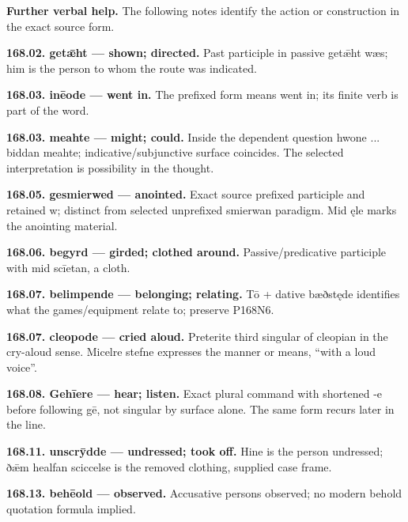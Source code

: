 \textbf{Further verbal help.} The following notes identify the action or construction in the exact source form.

\textbf{168.02. getǣht — shown; directed.} Past participle in passive getǣht wæs; him is the person to whom the route was indicated.

\textbf{168.03. inēode — went in.} The prefixed form means went in; its finite verb is part of the word.

\textbf{168.03. meahte — might; could.} Inside the dependent question hwone ... biddan meahte; indicative/\allowbreak{}subjunctive surface coincides. The selected interpretation is possibility in the thought.

\textbf{168.05. gesmierwed — anointed.} Exact source prefixed participle and retained w; distinct from selected unprefixed smierwan paradigm. Mid ęle marks the anointing material.

\textbf{168.06. begyrd — girded; clothed around.} Passive/\allowbreak{}predicative participle with mid scīetan, a cloth.

\textbf{168.07. belimpende — belonging; relating.} Tō + dative bæðstęde identifies what the games/\allowbreak{}equipment relate to; preserve P168N6.

\textbf{168.07. cleopode — cried aloud.} Preterite third singular of cleopian in the cry-aloud sense. Micelre stefne expresses the manner or means, “with a loud voice”.

\textbf{168.08. Gehīere — hear; listen.} Exact plural command with shortened -e before following gē, not singular by surface alone. The same form recurs later in the line.

\textbf{168.11. unscrȳdde — undressed; took off.} Hine is the person undressed; ðǣm healfan sciccelse is the removed clothing, supplied case frame.

\textbf{168.13. behēold — observed.} Accusative persons observed; no modern behold quotation formula implied.

